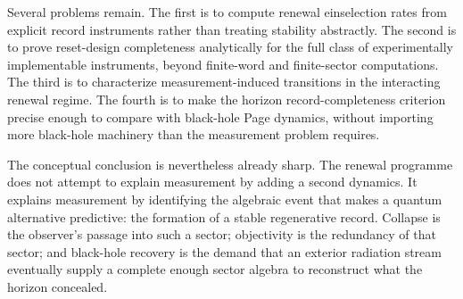\documentclass[11pt]{article}
\numberwithin{equation}{section}
\theoremstyle{definition}
\theoremstyle{remark}
\begin{document}
Several problems remain.  The first is to compute renewal einselection rates from explicit record instruments rather than treating stability abstractly.  The second is to prove reset-design completeness analytically for the full class of experimentally implementable instruments, beyond finite-word and finite-sector computations.  The third is to characterize measurement-induced transitions in the interacting renewal regime.  The fourth is to make the horizon record-completeness criterion precise enough to compare with black-hole Page dynamics, without importing more black-hole machinery than the measurement problem requires.

The conceptual conclusion is nevertheless already sharp.  The renewal programme does not attempt to explain measurement by adding a second dynamics.  It explains measurement by identifying the algebraic event that makes a quantum alternative predictive: the formation of a stable regenerative record.  Collapse is the observer's passage into such a sector; objectivity is the redundancy of that sector; and black-hole recovery is the demand that an exterior radiation stream eventually supply a complete enough sector algebra to reconstruct what the horizon concealed.
\end{document}

